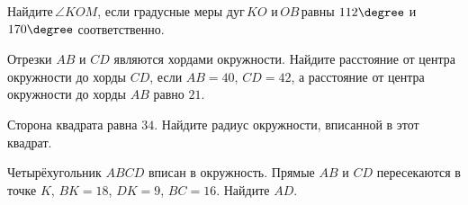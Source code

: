 \begin{consultation}
	\begin{listofex}
		\item Найдите \( \angle KOM \), если градусные меры дуг \( KO \) и \( OB \) равны \( 112\degree \) и \( 170\degree \) соответственно.
		\item Отрезки \( AB \) и \( CD \) являются хордами окружности. Найдите расстояние от центра окружности до хорды \( CD \), если \( AB=40 \), \( CD=42 \), а расстояние от центра окружности до хорды \( AB \) равно \( 21 \).
		\item Сторона квадрата равна \( 34 \). Найдите радиус окружности, вписанной в этот квадрат.
		\item Четырёхугольник \( ABCD \) вписан в окружность. Прямые \( AB \) и \( CD \) пересекаются в точке \( K \), \( BK=18 \), \( DK=9 \), \( BC=16 \). Найдите \( AD \).
	\end{listofex}
\end{consultation}
